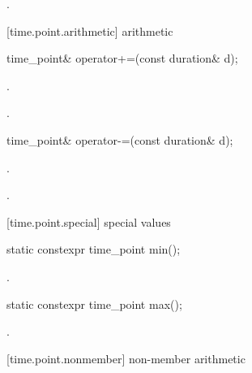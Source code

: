 \begin{itemdescr}
\pnum
\returns {}.
\end{itemdescr}

[time.point.arithmetic]{ arithmetic}

%
%
\begin{itemdecl}
time_point& operator+=(const duration& d);
\end{itemdecl}

\begin{itemdescr}
\pnum
\effects {}.

\pnum
\returns {}.
\end{itemdescr}

%
%
\begin{itemdecl}
time_point& operator-=(const duration& d);
\end{itemdecl}

\begin{itemdescr}
\pnum
\effects {}.

\pnum
\returns {}.
\end{itemdescr}

[time.point.special]{ special values}

%
%
\begin{itemdecl}
static constexpr time_point min();
\end{itemdecl}

\begin{itemdescr}
\pnum
\returns {}.
\end{itemdescr}

%
%
\begin{itemdecl}
static constexpr time_point max();
\end{itemdecl}

\begin{itemdescr}
\pnum
\returns {}.
\end{itemdescr}

[time.point.nonmember]{ non-member arithmetic}

